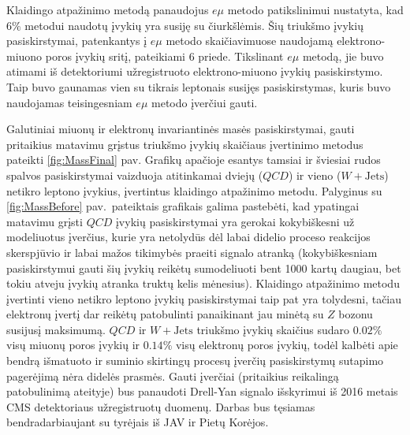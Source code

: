 \documentclass[a4paper, 12pt, oneside]{article}
\newcommand{\emu}{e\mu}
\newcommand{\WJets}{W\! +\!\mathrm{Jets}}
\newcommand{\QCD}{QC\! D}
\begin{document}
Klaidingo atpažinimo metodą panaudojus $\emu$ metodo patikslinimui nustatyta, kad $6\%$ metodui naudotų įvykių yra susiję su
čiurkšlėmis.
Šių triukšmo įvykių pasiskirstymai, patenkantys į $\emu$ metodo skaičiavimuose naudojamą elektrono-miuono poros įvykių
sritį, pateikiami 6 priede.
Tikslinant $\emu$ metodą, jie buvo atimami iš detektoriumi užregistruoto elektrono-miuono įvykių pasiskirstymo.
Taip buvo gaunamas vien su tikrais leptonais susijęs pasiskirstymas, kuris buvo naudojamas teisingesniam $\emu$ metodo įverčiui gauti.

Galutiniai miuonų ir elektronų invariantinės masės pasiskirstymai, gauti pritaikius matavimu grįstus triukšmo įvykių skaičiaus
įvertinimo metodus pateikti \ref{fig:MassFinal} pav.
Grafikų apačioje esantys tamsiai ir šviesiai rudos spalvos pasiskirstymai vaizduoja atitinkamai dviejų ($\QCD$) ir vieno
($\WJets$) netikro leptono įvykius, įvertintus klaidingo atpažinimo metodu.
Palyginus su \ref{fig:MassBefore} pav.\ pateiktais grafikais galima pastebėti, kad ypatingai matavimu grįsti $\QCD$ įvykių
pasiskirstymai yra gerokai kokybiškesni už modeliuotus įverčius, kurie yra netolydūs dėl labai didelio proceso reakcijos
skerspjūvio ir labai mažos tikimybės praeiti signalo atranką (kokybiškesniam pasiskirstymui gauti
šių įvykių reikėtų sumodeliuoti bent 1000 kartų daugiau, bet tokiu atveju įvykių atranka truktų kelis mėnesius).
Klaidingo atpažinimo metodu įvertinti vieno netikro leptono įvykių pasiskirstymai taip pat yra tolydesni,
tačiau elektronų įvertį dar reikėtų patobulinti panaikinant jau minėtą su $Z$ bozonu susijusį maksimumą.
$\QCD$ ir $\WJets$ triukšmo įvykių skaičius sudaro $0.02\%$ visų miuonų poros įvykių ir $0.14\%$ visų elektronų poros įvykių,
todėl kalbėti apie bendrą išmatuoto ir suminio skirtingų procesų įverčių pasiskirstymų sutapimo pagerėjimą nėra didelės prasmės.
Gauti įverčiai (pritaikius reikalingą patobulinimą ateityje) bus panaudoti Drell-Yan signalo išskyrimui iš 2016 metais CMS
detektoriaus užregistruotų duomenų.
Darbas bus tęsiamas bendradarbiaujant su tyrėjais iš JAV ir Pietų Korėjos.
\end{document}

